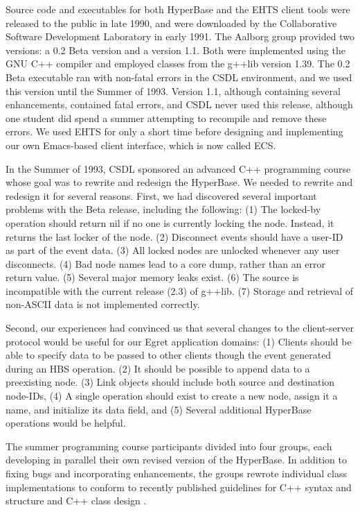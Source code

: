 Source code and executables for both HyperBase and the EHTS client tools
were released to the public in late 1990, and were downloaded by the
Collaborative Software Development Laboratory in early 1991.  The Aalborg
group provided two versions: a 0.2 Beta version and a version 1.1.  Both
were implemented using the GNU C++ compiler and employed classes from the
g++lib version 1.39.  The 0.2 Beta executable ran with non-fatal errors in
the CSDL environment, and we used this version until the Summer of 1993.
Version 1.1, although containing several enhancements, contained fatal
errors, and CSDL never used this release, although one student did spend a
summer attempting to recompile and remove these errors.  We used EHTS for
only a short time before designing and implementing our own Emacs-based
client interface, which is now called ECS.

In the Summer of 1993, CSDL sponsored an advanced C++ programming course
whose goal was to rewrite and redesign the HyperBase.  We needed to rewrite
and redesign it for several reasons. First, we had discovered several
important problems with the Beta release, including the following: (1) The
locked-by operation should return nil if no one is currently locking the
node.  Instead, it returns the last locker of the node. (2) Disconnect
events should have a user-ID as part of the event data. (3) All locked
nodes are unlocked whenever any user disconnects.  (4) Bad node names lead
to a core dump, rather than an error return value.  (5) Several major
memory leaks exist.  (6) The source is incompatible with the current
release (2.3) of g++lib. (7) Storage and retrieval of non-ASCII data is
not implemented correctly.

Second, our experiences had convinced us that several changes to the
client-server protocol would be useful for our Egret application domains: (1)
Clients should be able to specify data to be passed to other clients though
the event generated during an HBS operation.  (2) It should be possible to
append data to a preexisting node.  (3) Link objects should include both
source and destination node-IDs, (4) A single operation should exist to
create a new node, assign it a name, and initialize its data field, and (5)
Several additional HyperBase operations would be helpful.

The summer programming course participants divided into four groups, each developing in
parallel their own revised version of the HyperBase.  In addition to fixing
bugs and incorporating enhancements, the groups rewrote
individual class implementations to conform to recently published
guidelines for C++ syntax and structure \cite{Ellemtel92} and C++ class design
\cite{Cargill92,Coplien92}.


